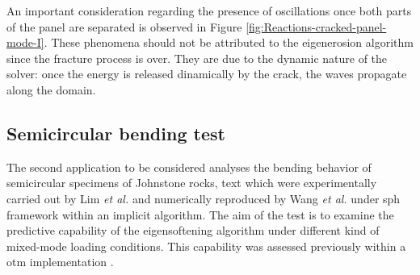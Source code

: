 \documentclass[preprint,12pt,a4paper]{elsarticle}
\begin{document}
An important consideration regarding the presence of oscillations once
both parts of the panel are separated is observed in Figure
\ref{fig:Reactions-cracked-panel-mode-I}. These phenomena should not be
attributed to the eigenerosion algorithm since the fracture process is
over. They are due to the dynamic nature of the solver: once the
energy is released dinamically by the crack, the waves propagate
along the domain.


\subsection{Semicircular bending test}
\label{sec:3.2}

The second application to be considered analyses the bending behavior of semicircular specimens of Johnstone rocks, text which were experimentally carried out by Lim {\it et
  al.} \cite{LIM_1993} and numerically reproduced by Wang {\it et
  al.}\cite{Wang_2020} under \acrshort{sph} framework within an
implicit algorithm. The aim of the test is to examine the predictive
capability of the eigensoftening algorithm under different kind of
mixed-mode loading conditions. This capability was assessed previously within a
\acrshort{otm} implementation \cite{Navas_2018_ES}.
\end{document}
